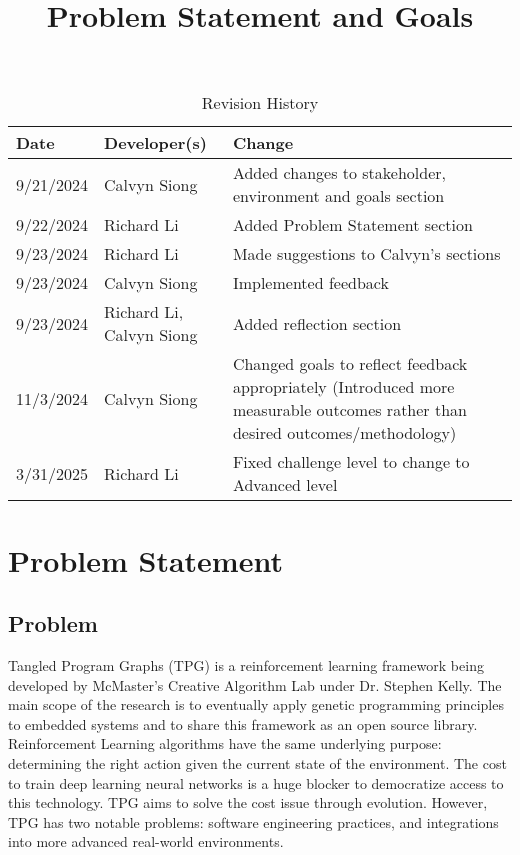 \documentclass{article}
\title{Problem Statement and Goals\\\progname}
\author{\authname}
\date{}
\begin{document}
\maketitle

\begin{table}[hp]
\caption{Revision History} \label{TblRevisionHistory}
\begin{tabularx}{\textwidth}{llX}
\toprule
\textbf{Date} & \textbf{Developer(s)} & \textbf{Change}\\
\midrule
9/21/2024 & Calvyn Siong & Added changes to stakeholder, environment and goals section \\
9/22/2024 & Richard Li & Added Problem Statement section \\
9/23/2024 & Richard Li & Made suggestions to Calvyn's sections \\
9/23/2024 & Calvyn Siong & Implemented feedback \\
9/23/2024 & Richard Li, Calvyn Siong & Added reflection section \\
11/3/2024 & Calvyn Siong & Changed goals to reflect feedback appropriately (Introduced more measurable outcomes rather than desired outcomes/methodology) \\
3/31/2025 & Richard Li & Fixed challenge level to change to Advanced level \\

\bottomrule
\end{tabularx}
\end{table}

\section{Problem Statement}

\subsection{Problem}

Tangled Program Graphs (TPG) is a reinforcement learning framework being developed by McMaster’s Creative Algorithm Lab under Dr. Stephen Kelly. The main scope of the research is to eventually apply genetic programming principles to embedded systems and to share this framework as an open source library. Reinforcement Learning algorithms have the same underlying purpose: determining the right action given the current state of the environment. The cost to train deep learning neural networks is a huge blocker to democratize access to this technology. TPG aims to solve the cost issue through evolution. However, TPG has two notable problems: software engineering practices, and integrations into more advanced real-world environments.
\end{document}
